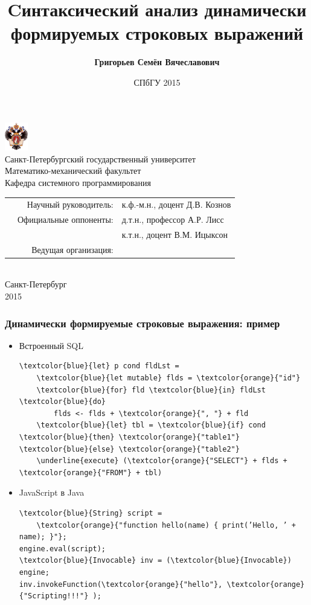 \documentclass{beamer}
\title[]{Cинтаксический анализ динамически формируемых строковых выражений}
\author[Григорьев Семён]{{\bfseries Григорьев Семён Вячеславович}}
\begin{document}
{
{
\begin{frame}
\begin{center}
{\includegraphics[width=1cm]{SPbGU_Logo.png}}
\\
{\scriptsize{Санкт-Петербургский государственный университет \\
 Математико-механический факультет \\
 Кафедра системного программирования}}

\titlepage
\vspace{-30pt}
{\tiny
 {
 \begin{tabular} {p{5cm} r l} 
  &{Научный руководитель:}  & к.ф.-м.н., доцент Д.В. Кознов \\ 
  &{Официальные оппоненты:} & д.т.н., профессор  А.Р. Лисс \\ 
  &                         & к.т.н., доцент В.М. Ицыксон \\
  &{Ведущая организация:} &  \\ 
 \end{tabular}
 }}
  \\
  \vspace{32pt}
  Санкт-Петербург\\
  2015
  \end{center}
\end{frame}
}
}

\date{СПбГУ 2015}

\begin{frame}[fragile]
    \transwipe[direction=90]
    \frametitle{Динамически формируемые строковые выражения: пример}
    \begin{itemize}
        \item Встроенный SQL
\begin{Verbatim}[commandchars=\\\{\}]
\textcolor{blue}{let} p cond fldLst =
    \textcolor{blue}{let mutable} flds = \textcolor{orange}{"id"}
    \textcolor{blue}{for} fld \textcolor{blue}{in} fldLst \textcolor{blue}{do}
        flds <- flds + \textcolor{orange}{", "} + fld 
    \textcolor{blue}{let} tbl = \textcolor{blue}{if} cond \textcolor{blue}{then} \textcolor{orange}{"table1"} \textcolor{blue}{else} \textcolor{orange}{"table2"}    
    \underline{execute} (\textcolor{orange}{"SELECT"} + flds + \textcolor{orange}{"FROM"} + tbl)
\end{Verbatim}
        \item JavaScript в Java
\begin{Verbatim}[commandchars=\\\{\}]
\textcolor{blue}{String} script =
    \textcolor{orange}{"function hello(name) { print(’Hello, ’ + name); }"};
engine.eval(script);
\textcolor{blue}{Invocable} inv = (\textcolor{blue}{Invocable}) engine;
inv.invokeFunction(\textcolor{orange}{"hello"}, \textcolor{orange}{"Scripting!!!"} );
\end{Verbatim}
    \end{itemize}

\end{frame}
\end{document}
